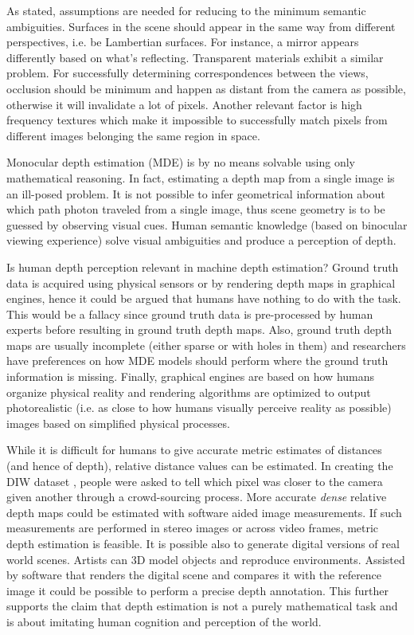 As stated, assumptions are needed for reducing to the minimum semantic ambiguities.
Surfaces in the scene should appear in the same way from different perspectives, i.e. be Lambertian surfaces.
For instance, a mirror appears differently based on what's reflecting.
Transparent materials exhibit a similar problem.
For successfully determining correspondences between the views, occlusion should be minimum and happen as distant from the camera as possible, otherwise it will invalidate a lot of pixels.
Another relevant factor is high frequency textures which make it impossible to successfully match pixels from different images belonging the same region in space.

\vspace{0.5cm}

Monocular depth estimation (MDE) is by no means solvable using only mathematical reasoning.
In fact, estimating a depth map from a single image is an ill-posed problem.
It is not possible to infer geometrical information about which path photon traveled from a single image, thus scene geometry is to be guessed by observing visual cues.
Human semantic knowledge (based on binocular viewing experience) solve visual ambiguities and produce a perception of depth.

Is human depth perception relevant in machine depth estimation?
Ground truth data is acquired using physical sensors or by rendering depth maps in graphical engines, hence it could be argued that humans have nothing to do with the task.
This would be a fallacy since ground truth data is pre-processed by human experts before resulting in ground truth depth maps.
Also, ground truth depth maps are usually incomplete (either sparse or with holes in them) and researchers have preferences on how MDE models should perform where the ground truth information is missing.
Finally, graphical engines are based on how humans organize physical reality and rendering algorithms are optimized to output photorealistic (i.e. as close to how humans visually perceive reality as possible) images based on simplified physical processes.

\vspace{0.5cm}

While it is difficult for humans to give accurate metric estimates of distances (and hence of depth), relative distance values can be estimated.
In creating the DIW dataset \cite{DIW}, people were asked to tell which pixel was closer to the camera given another through a crowd-sourcing process.
More accurate \textit{dense} relative depth maps could be estimated with software aided image measurements.
If such measurements are performed in stereo images or across video frames, metric depth estimation is feasible.
It is possible also to generate digital versions of real world scenes.
Artists can 3D model objects and reproduce environments.
Assisted by software that renders the digital scene and compares it with the reference image it could be possible to perform a precise depth annotation.
This further supports the claim that depth estimation is not a purely mathematical task and is about imitating human cognition and perception of the world.

